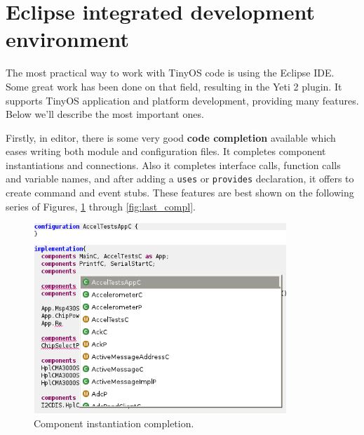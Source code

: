 \section{Eclipse integrated development environment}

The most practical way to work with TinyOS code is using the Eclipse
IDE. Some great work has been done on that field, resulting in the Yeti 2
plugin. It supports TinyOS application and platform development,
providing many features. Below we'll describe the most important ones.

Firstly, in editor, there is some very good {\bf code completion} available
which eases writing both module and configuration files. It completes
component instantiations and connections. Also it completes interface
calls, function calls and variable names, and after adding a
\texttt{uses} or \texttt{provides} declaration, it offers to create
command and event stubs. These features are best shown on the
following series of Figures, \ref{fig:first_compl} through
\ref{fig:last_compl}.

\begin{figure}[h]
  \centering
  \includegraphics[width=0.85\textwidth]{img/eclipse_compl1.png}
  \caption{Component instantiation completion.}
  \label{fig:first_compl}
\end{figure}

